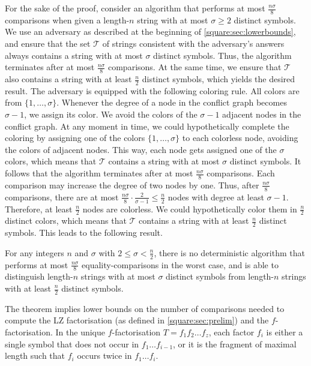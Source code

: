For the sake of the proof, consider an algorithm that performs at most $\frac{n\sigma} 8$ comparisons when given a length-$n$ string with at most $\sigma \geq 2$ distinct symbols. We use an adversary as described at the beginning of \cref{square:sec:lowerbounds}, and ensure that the set $\mathcal T$ of strings consistent with the adversary's answers always contains a string with at most $\sigma$ distinct symbols. Thus, the algorithm terminates after at most $\frac{n\sigma} 8$ comparisons. At the same time, we ensure that $\mathcal T$ also contains a string with at least $\frac n 2$ distinct symbols, which yields the desired result. The adversary is equipped with the following coloring rule.
All colors are from $\{1, \dots, \sigma\}$. Whenever the degree of a node in the conflict graph becomes $\sigma - 1$, we assign its color. 
We avoid the colors of the $\sigma - 1$ adjacent nodes in the conflict graph.
At any moment in time, we could hypothetically complete the coloring by assigning one of the colors $\{1, \dots, \sigma\}$ to each colorless node, avoiding the colors of adjacent nodes.
This way, each node gets assigned one of the $\sigma$ colors, which means that $\mathcal T$ contains a string with at most $\sigma$ distinct symbols.
It follows that the algorithm terminates after at most $\frac{n\sigma} 8$ comparisons.
Each comparison may increase the degree of two nodes by one. Thus, after $\frac{n\sigma} 8$ comparisons, there are at most $\frac{n\sigma} 8 \cdot \frac 2{\sigma - 1} \leq \frac{n}{2}$ nodes with degree at least $\sigma - 1$. Therefore, at least $\frac{n}{2}$ nodes are colorless. We could hypothetically color them in $\frac{n}{2}$ distinct colors, which means that $\mathcal T$ contains a string with at least $\frac{n}{2}$ distinct symbols. This leads to the following result.

\begin{theorem}
\label{thm:inapproxalph}
For any integers $n$ and $\sigma$ with $2 \leq \sigma < \frac{n}2$, there is no deterministic algorithm that performs at most $\frac{n \sigma}8$ equality-comparisons in the worst case, and is able to distinguish length-$n$ strings with at most $\sigma$ distinct symbols from length-$n$ strings with at least $\frac{n}2$ distinct symbols. 
\end{theorem}

The theorem implies lower bounds on the number of comparisons needed to compute the LZ factorisation (as defined in \cref{square:sec:prelim}) and the $f$-factorisation.
In the unique $f$-factorisation $T = f_1f_2\dots f_z$, each factor $f_i$ is either a single symbol that does not occur in $f_1\dots f_{i - 1}$, or it is the fragment of maximal length such that $f_{i}$ occurs twice in $f_1\dots f_{i}$. 

